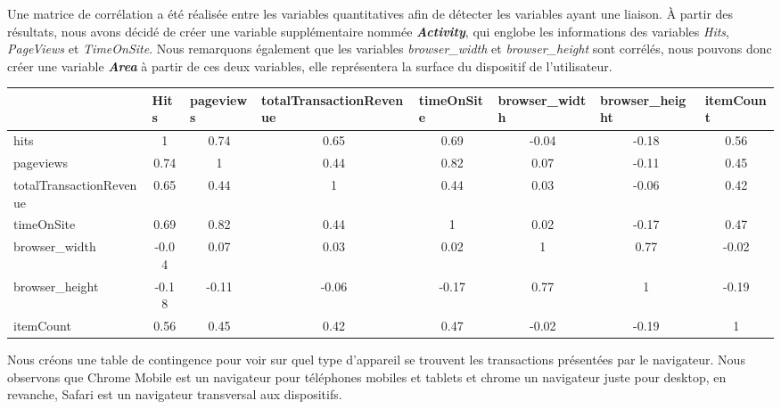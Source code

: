 Une matrice de corrélation a été réalisée entre les variables quantitatives afin de détecter les  variables ayant une liaison. À partir des résultats, nous avons décidé de créer une variable  supplémentaire nommée \emph{\textbf{Activity}}, qui englobe les informations des variables  \emph{Hits}, \emph{PageViews} et \emph{TimeOnSite}. Nous remarquons également que les  variables \emph{browser\_width} et \emph{browser\_height} sont corrélés, nous pouvons donc  créer une variable \emph{\textbf{Area}} à partir de ces deux variables, elle représentera la surface  du dispositif de l'utilisateur. 

\begin{table}[ht] 
\begin{adjustbox}{width=1\textwidth} 
\small 
\begin{tabular}{|l|c|c|c|c|c|c|c|} 
\hline 
& \multicolumn{1}{l|}{Hits} & \multicolumn{1}{l|}{pageviews} &  
\multicolumn{1}{l|}{totalTransactionRevenue} & \multicolumn{1}{l|}{timeOnSite} & 
\multicolumn{1}{l|}{browser\_width} & \multicolumn{1}{l|}{browser\_height} &  \multicolumn{1}{l|}{itemCount} \\ \hline 
hits & 1 & \cellcolor{green!15} 0.74 & 0.65 & 0.69 & -0.04 & -0.18 & 0.56 \\ \hline pageviews & \cellcolor{green!15}0.74 & 1 & 0.44 & \cellcolor{green!15}0.82 & 0.07 & -0.11 & 0.45 \\ \hline 
totalTransactionRevenue & 0.65 & 0.44 & 1 & 0.44 & 0.03 & -0.06 & 0.42 \\ \hline timeOnSite & 0.69 &\cellcolor{green!15} 0.82 & 0.44 & 1 & 0.02 & -0.17 & 0.47 \\ \hline browser\_width & -0.04 & 0.07 & 0.03 & 0.02 & 1 & \cellcolor{green!15}0.77 & -0.02 \\ \hline browser\_height & -0.18 & -0.11 & -0.06 & -0.17 &\cellcolor{green!15} 0.77 & 1 & -0.19 \\ \hline itemCount & 0.56 & 0.45 & 0.42 & 0.47 & -0.02 & -0.19 & 1 \\ \hline 
\end{tabular} 
\end{adjustbox} 
\end{table} 
Nous créons une table de contingence pour voir sur quel type d'appareil se trouvent les transactions  présentées par le navigateur. Nous observons que Chrome Mobile est un navigateur pour  téléphones mobiles et tablets et chrome un navigateur juste pour desktop, en revanche, Safari est  un navigateur transversal aux dispositifs. 

